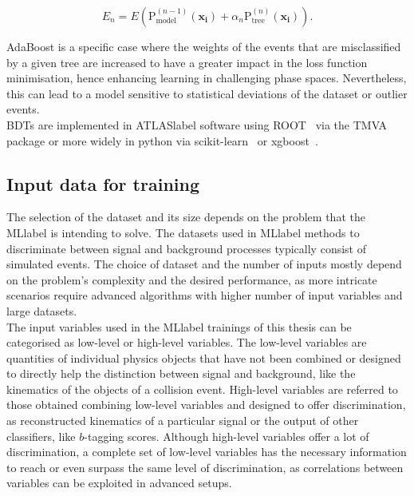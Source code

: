 \begin{equation}
    E_n = E\left(\text{P}_{\text{model}}^{(n-1)}(\mathbf{x_i})+\alpha_n \text{P}_{\text{tree}}^{(n)}(\mathbf{x_i})\right).
\end{equation}

AdaBoost is a specific case where the weights of the events that are misclassified by a given tree are increased to have a greater impact in the loss function minimisation, hence enhancing learning in challenging phase spaces. Nevertheless, this can lead to a model sensitive to statistical deviations of the dataset or outlier events.\\

BDTs are implemented in \acrshort{ATLASlabel} software using ROOT~\cite{BRUN199781} via the TMVA~\cite{TMVA} package or more widely in python via scikit-learn~\cite{scikit-learn} or xgboost~\cite{Chen_2016}.

\subsection{Input data for training}

The selection of the dataset and its size depends on the problem that the \acrshort{MLlabel} is intending to solve. The datasets used in \acrshort{MLlabel} methods to discriminate between signal and background processes typically consist of simulated events. The choice of dataset and the number of inputs mostly depend on the problem's complexity and the desired performance, as more intricate scenarios require advanced algorithms with higher number of input variables and large datasets.\\

The input variables used in the \acrshort{MLlabel} trainings of this thesis can be categorised as low-level or high-level variables. The low-level variables are quantities of individual physics objects that have not been combined or designed to directly help the distinction between signal and background, like the kinematics of the objects of a collision event. High-level variables are referred to those obtained combining low-level variables and designed to offer discrimination, as reconstructed kinematics of a particular signal or the output of other classifiers, like $b$-tagging scores. Although high-level variables offer a lot of discrimination, a complete set of low-level variables has the necessary information to reach or even surpass the same level of discrimination, as correlations between variables can be exploited in advanced setups.\\

